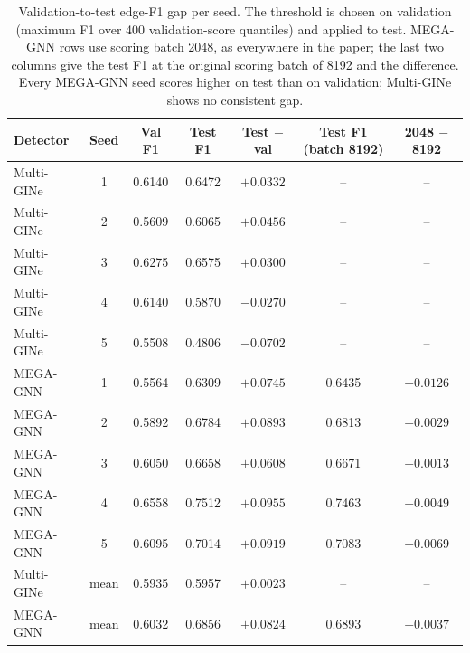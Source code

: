 \begin{table}[t]
\centering
\caption{Validation-to-test edge-F1 gap per seed. The threshold is chosen on validation
(maximum F1 over 400 validation-score quantiles) and applied to test. MEGA-GNN rows use
scoring batch 2048, as everywhere in the paper; the last two columns give the test F1 at the
original scoring batch of 8192 and the difference. Every MEGA-GNN seed scores higher on test
than on validation; Multi-GINe shows no consistent gap.}
\label{tab:val-test-gap}
\small
\begin{tabular}{lcccccc}
\toprule
Detector & Seed & Val F1 & Test F1 & Test $-$ val & Test F1 (batch 8192) & 2048 $-$ 8192 \\
\midrule
Multi-GINe & 1 & 0.6140 & 0.6472 & $+0.0332$ & -- & -- \\ %
Multi-GINe & 2 & 0.5609 & 0.6065 & $+0.0456$ & -- & -- \\ %
Multi-GINe & 3 & 0.6275 & 0.6575 & $+0.0300$ & -- & -- \\ %
Multi-GINe & 4 & 0.6140 & 0.5870 & $-0.0270$ & -- & -- \\ %
Multi-GINe & 5 & 0.5508 & 0.4806 & $-0.0702$ & -- & -- \\ %
\midrule
MEGA-GNN & 1 & 0.5564 & 0.6309 & $+0.0745$ & 0.6435 & $-0.0126$ \\ %
MEGA-GNN & 2 & 0.5892 & 0.6784 & $+0.0893$ & 0.6813 & $-0.0029$ \\ %
MEGA-GNN & 3 & 0.6050 & 0.6658 & $+0.0608$ & 0.6671 & $-0.0013$ \\ %
MEGA-GNN & 4 & 0.6558 & 0.7512 & $+0.0955$ & 0.7463 & $+0.0049$ \\ %
MEGA-GNN & 5 & 0.6095 & 0.7014 & $+0.0919$ & 0.7083 & $-0.0069$ \\ %
\midrule
Multi-GINe & mean & 0.5935 & 0.5957 & $+0.0023$ & -- & -- \\
MEGA-GNN & mean & 0.6032 & 0.6856 & $+0.0824$ & 0.6893 & $-0.0037$ \\
\bottomrule
\end{tabular}
\end{table}
